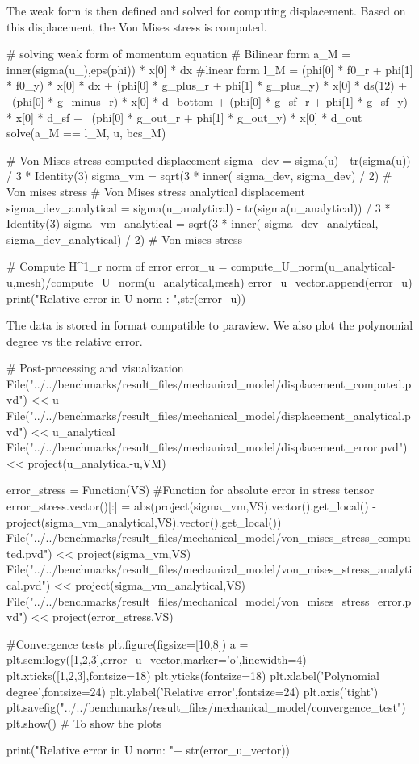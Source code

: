 The weak form is then defined and solved for computing displacement. Based on this displacement, the Von Mises stress is computed.
\begin{python}
# solving weak form of momentum equation
# Bilinear form
a_M = inner(sigma(u_),eps(phi)) * x[0] * dx
#linear form
l_M = (phi[0] * f0_r + phi[1] * f0_y) * x[0] * dx + (phi[0] * g_plus_r + phi[1] * g_plus_y) * x[0] * ds(12) + \
(phi[0] * g_minus_r) * x[0] * d_bottom + (phi[0] * g_sf_r + phi[1] * g_sf_y) * x[0] * d_sf + \
(phi[0] * g_out_r + phi[1] * g_out_y) * x[0] * d_out
solve(a_M == l_M, u, bcs_M)
\end{python}

\begin{python}
# Von Mises stress computed displacement
sigma_dev = sigma(u) - tr(sigma(u)) / 3 * Identity(3) 
sigma_vm = sqrt(3 * inner( sigma_dev, sigma_dev) / 2) # Von mises stress
# Von Mises stress analytical displacement
sigma_dev_analytical = sigma(u_analytical) - tr(sigma(u_analytical)) / 3 * Identity(3)
sigma_vm_analytical = sqrt(3 * inner( sigma_dev_analytical, sigma_dev_analytical) / 2) # Von mises stress

# Compute H^1_r norm of error
error_u = compute_U_norm(u_analytical-u,mesh)/compute_U_norm(u_analytical,mesh)
error_u_vector.append(error_u)
print("Relative error in U-norm : ",str(error_u))
\end{python}

The data is stored in format compatible to paraview. We also plot the polynomial degree vs the relative error.
\begin{python}
# Post-processing and visualization
File("../../benchmarks/result_files/mechanical_model/displacement_computed.pvd") << u
File("../../benchmarks/result_files/mechanical_model/displacement_analytical.pvd") << u_analytical
File("../../benchmarks/result_files/mechanical_model/displacement_error.pvd") << project(u_analytical-u,VM)

error_stress = Function(VS) #Function for absolute error in stress tensor
error_stress.vector()[:] = abs(project(sigma_vm,VS).vector().get_local() - project(sigma_vm_analytical,VS).vector().get_local())
File("../../benchmarks/result_files/mechanical_model/von_mises_stress_computed.pvd") << project(sigma_vm,VS)
File("../../benchmarks/result_files/mechanical_model/von_mises_stress_analytical.pvd") << project(sigma_vm_analytical,VS)
File("../../benchmarks/result_files/mechanical_model/von_mises_stress_error.pvd") << project(error_stress,VS)

#Convergence tests
plt.figure(figsize=[10,8])
a = plt.semilogy([1,2,3],error_u_vector,marker='o',linewidth=4)
plt.xticks([1,2,3],fontsize=18)
plt.yticks(fontsize=18)
plt.xlabel('Polynomial degree',fontsize=24)
plt.ylabel('Relative error',fontsize=24)
plt.axis('tight')
plt.savefig("../../benchmarks/result_files/mechanical_model/convergence_test")
plt.show() # To show the plots

print("Relative error in U norm: "+ str(error_u_vector))
\end{python}

